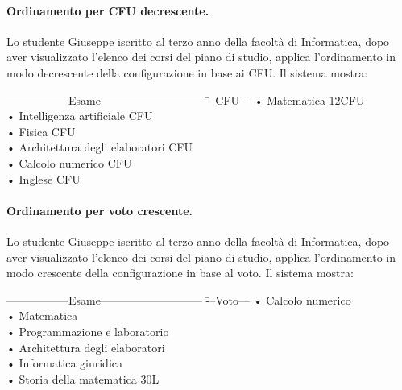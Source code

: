 \paragraph{Ordinamento per CFU decrescente.}
Lo studente Giuseppe iscritto al terzo anno della facoltà di Informatica, dopo aver visualizzato l'elenco dei corsi del piano di studio, applica l'ordinamento in modo decrescente della configurazione in base ai CFU. Il sistema mostra:
\begin{tabbing}
	\hspace{1cm}-----------------Esame--------------------------- \= ---CFU--- \kill
	\hspace{1cm} • Matematica \> 12CFU\\
	\hspace{1cm} • Intelligenza artificiale  CFU\\
	\hspace{1cm} • Fisica  CFU\\
	\hspace{1cm} • Architettura degli elaboratori  CFU\\
	\hspace{1cm} • Calcolo numerico   CFU\\
	\hspace{1cm} • Inglese  CFU\\
\end{tabbing}


\paragraph{Ordinamento per voto crescente.}
Lo studente Giuseppe iscritto al terzo anno della facoltà di Informatica, dopo aver visualizzato l'elenco dei corsi del piano di studio, applica l'ordinamento in modo crescente della configurazione in base al voto. Il sistema mostra:
\begin{tabbing}
	\hspace{1cm}-----------------Esame--------------------------- \= ---Voto--- \kill
	\hspace{1cm} • Calcolo numerico \\
	\hspace{1cm} • Matematica   \\
	\hspace{1cm} • Programmazione e laboratorio \\
	\hspace{1cm} • Architettura degli elaboratori \\
	\hspace{1cm} • Informatica giuridica \\
	\hspace{1cm} • Storia della matematica \> 30L\\
\end{tabbing}

